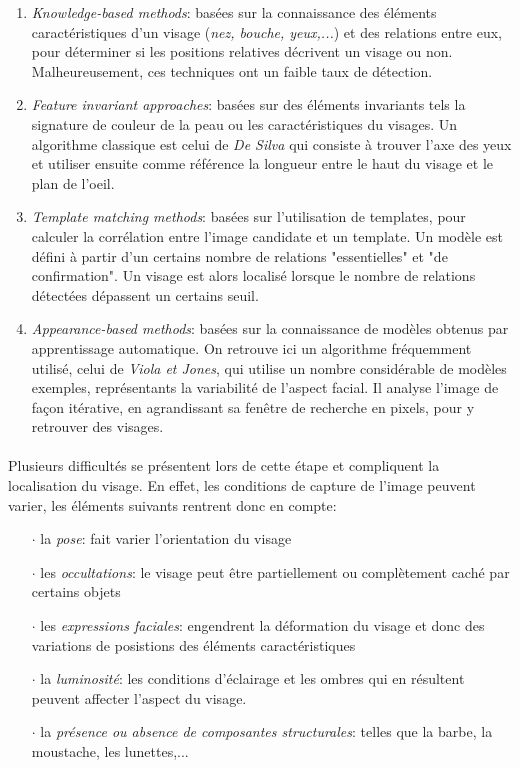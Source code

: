 \begin{enumerate}
\item \textit{Knowledge-based methods}: basées sur la connaissance des éléments caractéristiques d'un visage (\textit{nez, bouche, yeux,...}) et des relations entre eux, pour déterminer si les positions relatives décrivent un visage ou non. Malheureusement, ces techniques ont un faible taux de détection.
\item \textit{Feature invariant approaches}: basées sur des éléments invariants tels la signature de couleur de la peau ou les caractéristiques du visages. Un algorithme classique est celui de \textit{De Silva} qui consiste à trouver l'axe des yeux et utiliser ensuite comme référence la longueur entre le haut du visage et le plan de l'oeil.
\item \textit{Template matching methods}: basées sur l'utilisation de templates, pour calculer la corrélation entre l'image candidate et un template. Un modèle est défini à partir d'un certains nombre de relations "essentielles" et "de confirmation". Un visage est alors localisé lorsque le nombre de relations détectées dépassent un certains seuil.
\item \textit{Appearance-based methods}: basées sur la connaissance de modèles obtenus par apprentissage automatique. On retrouve ici un algorithme fréquemment utilisé, celui de \textit{Viola et Jones}, qui utilise un nombre considérable de modèles exemples, représentants la variabilité de l'aspect facial. Il analyse l'image de façon itérative, en agrandissant sa fenêtre de recherche en pixels, pour y retrouver des visages.
\end{enumerate}
\paragraph{}
Plusieurs difficultés se présentent lors de cette étape et compliquent la localisation du visage. En effet, les conditions de capture de l'image peuvent varier, les éléments suivants rentrent donc en compte:
\begin{itemize}
\item[$\cdot$]la \textit{pose}: fait varier l'orientation du visage
\item[$\cdot$]les \textit{occultations}: le visage peut être partiellement ou complètement caché par certains objets
\item[$\cdot$]les \textit{expressions faciales}: engendrent la déformation du visage et donc des variations de posistions des éléments caractéristiques
\item[$\cdot$]la \textit{luminosité}: les conditions d'éclairage et les ombres qui en résultent peuvent affecter l'aspect du visage.
\item[$\cdot$]la \textit{présence ou absence de composantes structurales}: telles que la barbe, la moustache, les lunettes,...
\end{itemize}

